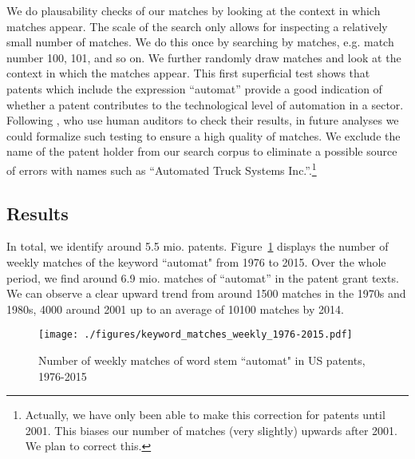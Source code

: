 \documentclass[11pt,a4paper,fleqn]{article}
\begin{document}
We do plausability checks of our matches by looking at the context in which matches appear. The scale of the search only allows for inspecting a relatively small number of matches. We do this once by searching by matches, e.g. match number 100, 101, and so on. We further randomly draw matches and look at the context in which the matches appear. This first superficial test shows that patents which include the expression ``automat'' provide a good indication of whether a patent contributes to the technological level of automation in a sector. Following \cite{BBD2013}, who use human auditors to check their results, in future analyses we could formalize such testing to ensure a high quality of matches. We exclude the name of the patent holder from our search corpus to eliminate a possible source of errors with names such as ``Automated Truck Systems Inc.''.\footnote{Actually, we have only been able to make this correction for patents until 2001. This biases our number of matches (very slightly) upwards after 2001. We plan to correct this.} 

\subsection{Results}
In total, we identify around 5.5 mio. patents. Figure~\ref{fig:keyword_match_over_time} displays the number of weekly matches of the keyword ``automat" from 1976 to 2015. Over the whole period, we find around 6.9 mio. matches of ``automat'' in the patent grant texts. We can observe a clear upward trend from around 1500 matches in the 1970s and 1980s, 4000 around 2001 up to an average of 10100 matches by 2014.


\begin{figure}[tb]
\caption{Number of weekly matches of word stem ``automat" in US patents, 1976-2015}
	\centering
	\texttt{[image: ./figures/keyword\_matches\_weekly\_1976-2015.pdf]}
	\label{fig:keyword_match_over_time}
\end{figure}
\end{document}
